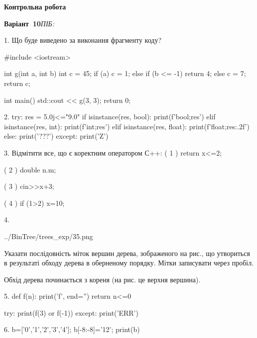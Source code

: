 \documentclass[11pt]{article}
\begin{document}
{\large\textbf{Контрольна робота}}

\textbf{Варіант \No\,10}\hfill \textit{ПІБ:}\,\underline{\hspace{60mm}}
\vspace{4mm}

1. Що буде виведено за виконання фрагменту коду?

#include <iostream>

int g(int a, int b){
    int c = 45;
    if (a)
        c = 1;
    else if (b <= -1)
         return 4;
    else 
        c = 7;
    return c;
}

int main(){
    std::cout << g(3, 3);
    return 0;
}
\vspace{5mm}

2. 
try:
    res = 5.0j<="9.0"
    if isinstance(res, bool):
        print(f'bool;{res}')
    elif isinstance(res, int):
        print(f'int;{res}')
    elif isinstance(res, float):
        print(f'float;{res:.2f}')
    else:
        print('???')
except:
    print('Z')
\vspace{5mm}

3. %
Відмітити все, що є коректним оператором С++:
( 1 ) return x<=2;

( 2 ) double n.m;

( 3 ) cin>>x+3;

( 4 ) if (1>2) x=10;
\vspace{5mm}

4. 

\begin{center}
	{../BinTree/trees_exp/35.png}
\end{center}
Указати послідовність міток вершин дерева, зображеного на рис., що утвориться в результаті обходу дерева в оберненому порядку. Мітки записувати через пробіл.\par Обхід дерева починається з кореня (на рис. це верхня вершина).
\vspace{5mm}

5. 
def f(n):
    print('f', end='')
    return n<=0

try:
    print(f(3) or f(-1))
except:
    print('ERR')
\vspace{5mm}

6. 
b=['0','1','2','3','4']; b[-8:-8]='12'; print(b)\vspace{5mm}
\end{document}
